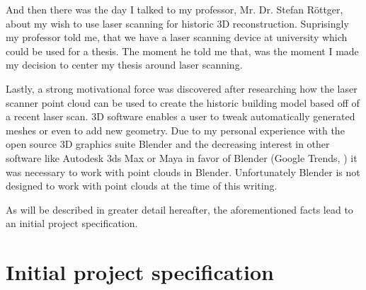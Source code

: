And then there was the day I talked to my professor, Mr. Dr. Stefan Röttger, about my wish to use laser scanning for historic 3D reconstruction. Suprisingly my professor told me, that we have a laser scanning device at university which could be used for a thesis. The moment he told me that, was the moment I made my decision to center my thesis around laser scanning.

Lastly, a strong motivational force was discovered after researching how the laser scanner point cloud can be used to create the historic building model based off of a recent laser scan. 3D software enables a user to tweak automatically generated meshes or even to add new geometry. Due to my personal experience with the open source 3D graphics suite Blender and the decreasing interest in other software like Autodesk 3ds Max or Maya in favor of Blender (Google Trends, \parencite{Interest3DSoftware}) it was necessary to work with point clouds in Blender. Unfortunately Blender is not designed to work with point clouds at the time of this writing.

As will be described in greater detail hereafter, the aforementioned facts lead to an initial project specification. 


\section{Initial project specification}

